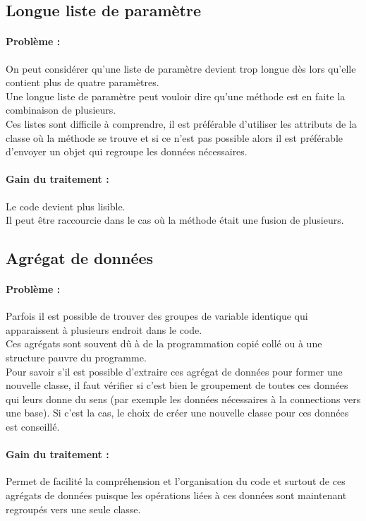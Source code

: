 \documentclass[a4paper,twoside,12pt,openright]{report}
\begin{document}
\subsection{Longue liste de paramètre}
\paragraph{Problème :}
On peut considérer qu'une liste de paramètre devient trop longue dès lors qu'elle contient plus de quatre paramètres.\\
Une longue liste de paramètre peut vouloir dire qu'une méthode est en faite la combinaison de plusieurs.\\
Ces listes sont difficile à comprendre, il est préférable d'utiliser les attributs de la classe où la méthode se trouve et si ce n'est pas possible alors il est préférable d'envoyer un objet qui regroupe les données nécessaires.\\

\paragraph{Gain du traitement :}
Le code devient plus lisible.\\
Il peut être raccourcie dans le cas où la méthode était une fusion de plusieurs.\\

\subsection{Agrégat de données}
\paragraph{Problème :}
Parfois il est possible de trouver des groupes de variable identique qui apparaissent à plusieurs endroit dans le code.\\
Ces agrégats sont souvent dû à de la programmation copié collé ou à une structure pauvre du programme.\\
Pour savoir s'il est possible d'extraire ces agrégat de données pour former une nouvelle classe, il faut vérifier si c'est bien le groupement de toutes ces données qui leurs donne du sens (par exemple les données nécessaires à la connections vers une base). Si c'est la cas, le choix de créer une nouvelle classe pour ces données est conseillé.\\

\paragraph{Gain du traitement :}
Permet de facilité la compréhension et l'organisation du code et surtout de ces agrégats de données puisque les opérations liées à ces données sont maintenant regroupés vers une seule classe.\\
\end{document}
